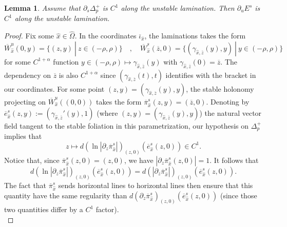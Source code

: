 \documentclass[a4paper]{article}
\newtheorem{lemma}[theorem]{Lemma}
\theoremstyle{definition}
\begin{document}
\begin{lemma}
Assume that $\partial_s \Delta_p^+$ is $C^1$ along the unstable lamination. Then $\partial_u E^s$ is $C^1$ along the unstable lamination.
\end{lemma}

\begin{proof}
Fix some $\widehat{x} \in \widehat{\Omega}$. In the coordinates $\overline{\iota}_{\widehat{x}}$, the laminations takes the form
$$ \overline{W}_{\widehat{x}}^u(0,y) = \{ (z,y) \ | \ z \in (-\rho,\rho) \} \quad , \quad \overline{W}_{\widehat{x}}^s(\overline{z},0) = \{ (\gamma_{{\widehat{x}},\overline{z}}(y),y) \ | \ y \in (-\rho,\rho) \} $$
for some $C^{1+\alpha}$ function $y \in (-\rho,\rho) \mapsto \gamma_{{\widehat{x}},\overline{z}}(y)$ with $\gamma_{{\widehat{x}},\overline{z}}(0)=\overline{z}$. The dependency on $\overline{z}$ is also $C^{1+\alpha}$ since $(\gamma_{{\widehat{x}},\overline{z}}(t),t)$ identifies with the bracket  in our coordinates.
For some point $(z,y) = (\gamma_{{\widehat{x}},\overline{z}}(y),y)$, the stable holonomy projecting on $\overline{W}^u_{\widehat{x}}((0,0))$ takes the form $\overline{\pi}_{\widehat{x}}^s(z,y) = (\overline{z},0)$. Denoting by $\overline{e}^s_{\widehat{x}}(z,y) := (\gamma_{{\widehat{x}},\overline{z}}'(y),1)$ (where $(z,y) = (\gamma_{{\widehat{x}},\overline{z}}(y),y)$) the natural vector field tangent to the stable foliation in this parametrization, our hypothesis on $\Delta_p^+$ implies that
$$ z \mapsto d(\ln |\partial_z \overline{\pi}_{\widehat{x}}^s|)_{(z,0)}(\overline{e}^s_{\widehat{x}}(z,0)) \in C^1 .$$
Notice that, since $\overline{\pi}_{{\widehat{x}}}^s(z,0)=(z,0)$, we have $|\partial_z \overline{\pi}_{\widehat{x}}^s(z,0)|=1$. It follows that $$ d(\ln |\partial_z \overline{\pi}_{\widehat{x}}^s|)_{(z,0)}(\overline{e}^s_{\widehat{x}}(z,0)) = d( |\partial_z \overline{\pi}_{\widehat{x}}^s|)_{(z,0)}(\overline{e}^s_{\widehat{x}}(z,0)). $$
The fact that $\overline{\pi}_{\widehat{x}}^s$ sends horizontal lines to horizontal lines then ensure that this quantity have the same regularity than $ d( \partial_z \overline{\pi}_{\widehat{x}}^s)_{(z,0)}(\overline{e}^s_{\widehat{x}}(z,0))$ (since those two quantities differ by a $C^{1}$ factor).\\


\end{proof}
\end{document}
